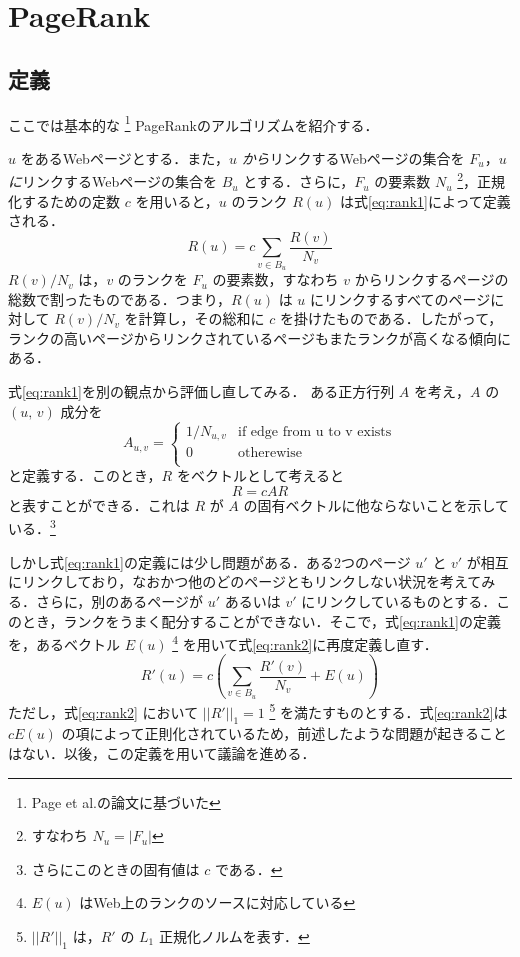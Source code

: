 \documentclass[a4j, dvipdfmx, twocolumn]{jsarticle}
\begin{document}
\section{PageRank}
\subsection{定義}
ここでは基本的な
\footnote{Page et al.\cite{ilprints422}の論文に基づいた}
PageRankのアルゴリズムを紹介する．

$u$ をあるWebページとする．また，$u$ \emph{から}リンクするWebページの集合を $F_u$，$u$ \emph{に}リンクするWebページの集合を $B_u$ とする．さらに，$F_u$ の要素数 $N_u$
\footnote{すなわち $N_u = |F_u|$}，正規化するための定数 $c$ を用いると，$u$ のランク $R(u)$ は式\eqref{eq:rank1}によって定義される．
\begin{equation}
  \label{eq:rank1}
  R(u) = c  \sum_{v \in B_u} \frac{R(v)}{N_v}
\end{equation}
$R(v) / N_v$ は，$v$ のランクを $F_u$ の要素数，すなわち $v$ からリンクするページの総数で割ったものである．つまり，$R(u)$ は $u$ にリンクするすべてのページに対して $R(v) / N_v$ を計算し，その総和に $c$ を掛けたものである．したがって，ランクの高いページからリンクされているページもまたランクが高くなる傾向にある．

式\eqref{eq:rank1}を別の観点から評価し直してみる．
ある正方行列 $A$ を考え，$A$ の $(u,\,v)$ 成分を
\begin{equation}
  \label{eq:Auv}
  A_{u,v} = \begin{cases}
    1/N_{u,v} & \text{if edge from u to v exists} \\
    0 & \text{otherewise} \\
  \end{cases}
\end{equation}
と定義する．このとき，$R$ をベクトルとして考えると
\begin{equation}
  \label{eq:R}
  R = cAR
\end{equation}
と表すことができる．これは $R$ が $A$ の固有ベクトルに他ならないことを示している．\footnote{さらにこのときの固有値は $c$ である．}

しかし式\eqref{eq:rank1}の定義には少し問題がある．ある2つのページ $u'$ と $v'$ が相互にリンクしており，なおかつ他のどのページともリンクしない状況を考えてみる．さらに，別のあるページが $u'$ あるいは $v'$ にリンクしているものとする．このとき，ランクをうまく配分することができない．そこで，式\eqref{eq:rank1}の定義を，あるベクトル $E(u)$ \footnote{$E(u)$ はWeb上のランクのソースに対応している} を用いて式\eqref{eq:rank2}に再度定義し直す．
\begin{equation}
  \label{eq:rank2}
  R'(u) = c \left( \sum_{v \in B_u} \frac{R'(v)}{N_v} + E(u)\right)
\end{equation}
ただし，式\eqref{eq:rank2} において $||R'||_1 = 1$ 
\footnote{$||R'||_1$ は，$R'$ の $L_1$ 正規化ノルムを表す．}
を満たすものとする．式\eqref{eq:rank2}は $cE(u)$ の項によって正則化されているため，前述したような問題が起きることはない．以後，この定義を用いて議論を進める．
\end{document}

